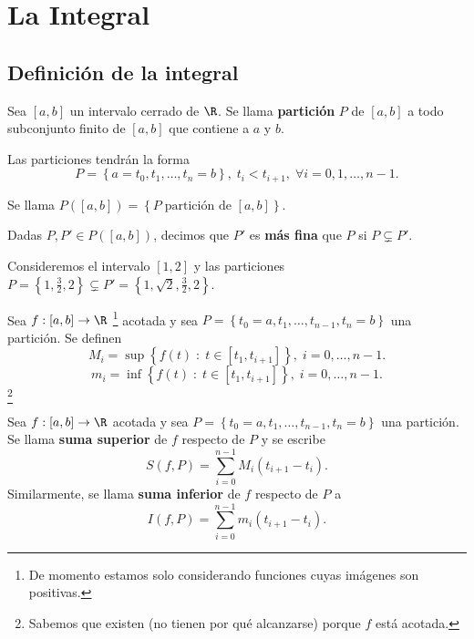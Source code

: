 \chapter{La Integral}
\section{Definición de la integral}
\begin{fdefinition}[Partición]
	\normalfont Sea $\displaystyle \left[a,b\right]  $ un intervalo cerrado de $\displaystyle \R $. Se llama \textbf{partición} $\displaystyle P $ de $\displaystyle [a,b] $ a todo subconjunto finito de $\displaystyle [a,b] $ que contiene a $\displaystyle a $ y $\displaystyle b $. 
\end{fdefinition}
\begin{observation}
\normalfont Las particiones tendrán la forma
\[ P = \left\{ a = t_{0}, t_{1}, \ldots, t_{n} = b\right\}, \; t_{i} < t_{i+1}, \; \forall i = 0,1, \ldots, n-1 .\]
\begin{notation}
\normalfont Se llama $\displaystyle P\left([a,b]\right) = \left\{ P \; \text{partición de } [a,b]\right\} $.
\end{notation}
\end{observation}
\begin{fdefinition}[]
	\normalfont Dadas $\displaystyle P, P' \in P\left([a,b]\right) $, decimos que $\displaystyle P' $ es \textbf{más fina} que $\displaystyle P $ si $\displaystyle P \subsetneq P' $.
\end{fdefinition}
\begin{eg}
	\normalfont Consideremos el intervalo $\displaystyle [1,2] $ y las particiones $\displaystyle P = \left\{ 1, \frac{3}{2}, 2\right\} \subsetneq P' = \left\{ 1, \sqrt{2},\frac{3}{2}, 2\right\}  $.
\end{eg}
\begin{fdefinition}[]
	\normalfont Sea $\displaystyle f: [a,b] \to \R $ \footnote{De momento estamos solo considerando funciones cuyas imágenes son positivas.} acotada y sea $\displaystyle P = \left\{ t_{0}= a, t_{1}, \ldots, t_{n-1}, t_{n} = b\right\}  $ una partición. Se definen
	\[ M_{i} = \sup \left\{ f\left(t\right) \; : \; t \in [t_{1}, t_{i+1}]\right\}, \; i = 0, \ldots, n-1  .\]
	\[ m_{i} = \inf \left\{ f\left(t\right) \; : \; t \in [t_{1}, t_{i+1}]\right\}, \; i = 0, \ldots, n-1  .\]
\footnote{Sabemos que existen (no tienen por qué alcanzarse) porque $\displaystyle f $ está acotada.} 	
\end{fdefinition}
\begin{fdefinition}[]
	\normalfont Sea $\displaystyle f : [a,b] \to \R $ acotada y sea $\displaystyle P = \left\{ t_{0}= a, t_{1}, \ldots, t_{n-1}, t_{n} = b\right\}  $ una partición. Se llama \textbf{suma superior} de $\displaystyle f $ respecto de $\displaystyle P $ y se escribe 
	\[ S\left(f, P\right) = \sum^{n-1}_{i = 0}M_{i}\left(t_{i+1}-t_{i}\right) .\]
	Similarmente, se llama \textbf{suma inferior} de $\displaystyle f $ respecto de $\displaystyle P $ a
	\[ I\left(f,P\right)= \sum^{n-1}_{i = 0}m_{i}\left(t_{i+1}-t_{i}\right) .\]
\end{fdefinition}
